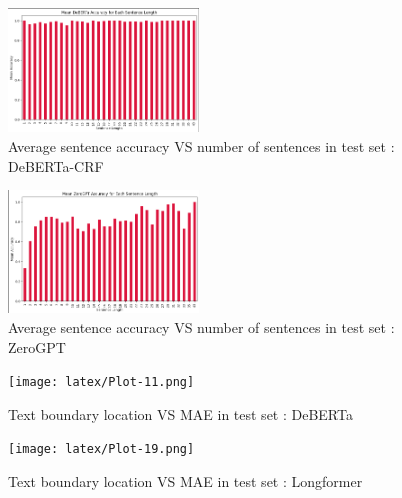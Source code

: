 \documentclass[11pt]{article}
\begin{document}
\begin{figure}[!ht]
\centering
\includegraphics[width=0.45\textwidth]{Plot-67.png}
\caption{Average sentence accuracy VS number of sentences in test set : DeBERTa-CRF}
\label{figure:2}
\end{figure}
\begin{figure}[!ht]
\centering
\includegraphics[width=0.45\textwidth]{Plot-69.png}
\caption{Average sentence accuracy VS number of sentences in test set : ZeroGPT}
\label{figure:3}
\end{figure}

\begin{figure}[!ht]
\centering
\texttt{[image: latex/Plot-11.png]}
\caption{Text boundary location VS MAE in test set : DeBERTa}
\label{figure:4}
\end{figure}
\begin{figure}[!ht]
\centering
\texttt{[image: latex/Plot-19.png]}
\caption{Text boundary location VS MAE in test set : Longformer}
\label{figure:5}
\end{figure}
\end{document}
